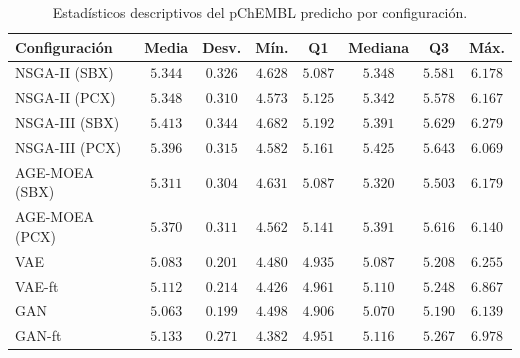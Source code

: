 \begin{table}[H]
\centering
\caption{Estadísticos descriptivos del pChEMBL predicho por configuración.}
\label{tab:pchembl_predicho}
\begin{tabular}{lccccccc}
\toprule
Configuración & Media & Desv. & Mín. & Q1 & Mediana & Q3 & Máx. \\
\midrule
NSGA-II (SBX) & $5.344$ & $0.326$ & $4.628$ & $5.087$ & $5.348$ & $5.581$ & $6.178$ \\
NSGA-II (PCX) & $5.348$ & $0.310$ & $4.573$ & $5.125$ & $5.342$ & $5.578$ & $6.167$ \\
NSGA-III (SBX) & $5.413$ & $0.344$ & $4.682$ & $5.192$ & $5.391$ & $5.629$ & $6.279$ \\
NSGA-III (PCX) & $5.396$ & $0.315$ & $4.582$ & $5.161$ & $5.425$ & $5.643$ & $6.069$ \\
AGE-MOEA (SBX) & $5.311$ & $0.304$ & $4.631$ & $5.087$ & $5.320$ & $5.503$ & $6.179$ \\
AGE-MOEA (PCX) & $5.370$ & $0.311$ & $4.562$ & $5.141$ & $5.391$ & $5.616$ & $6.140$ \\
\midrule
VAE & $5.083$ & $0.201$ & $4.480$ & $4.935$ & $5.087$ & $5.208$ & $6.255$ \\
VAE-ft & $5.112$ & $0.214$ & $4.426$ & $4.961$ & $5.110$ & $5.248$ & $6.867$ \\
GAN & $5.063$ & $0.199$ & $4.498$ & $4.906$ & $5.070$ & $5.190$ & $6.139$ \\
GAN-ft & $5.133$ & $0.271$ & $4.382$ & $4.951$ & $5.116$ & $5.267$ & $6.978$ \\
\bottomrule
\end{tabular}
\end{table}
